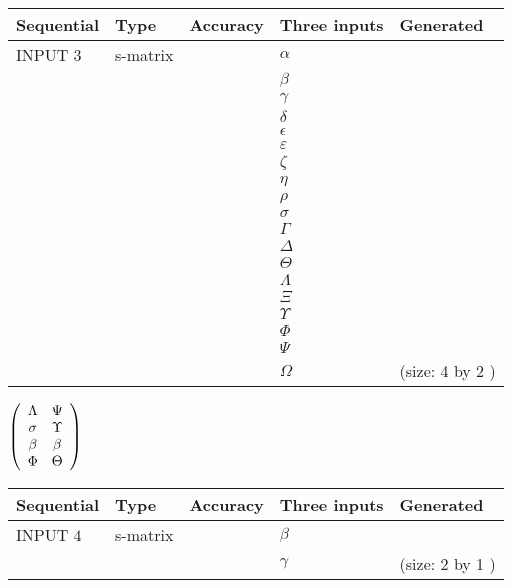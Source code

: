 \documentclass[12pt]{article}
\begin{document}
  
\noindent\begin{tabular}{|l|l|l|l|l|}
\hline
 Sequential & Type & Accuracy & Three inputs & Generated \\ 
\hline
 
 
  INPUT $            3 $ & s-matrix & & 
 $  \alpha $ & 
  \\
  & & & 
 $  \beta $ & 
  \\
  & & & 
 $  \gamma $ & 
  \\
  & & & 
 $  \delta $ & 
  \\
  & & & 
 $  \epsilon $ & 
  \\
  & & & 
 $  \varepsilon $ & 
  \\
  & & & 
 $                     \zeta $ & 
  \\
  & & & 
 $  \eta $ & 
  \\
  & & & 
 $  \rho $ & 
  \\
  & & & 
 $  \sigma $ & 
  \\
  & & & 
 $  \Gamma $ & 
  \\
  & & & 
 $  \Delta $ & 
  \\
  & & & 
 $  \Theta $ & 
  \\
  & & & 
 $  \Lambda $ & 
  \\
  & & & 
 $                     \Xi $ & 
  \\
  & & & 
 $  \Upsilon $ & 
  \\
  & & & 
 $  \Phi $ & 
  \\
  & & & 
 $  \Psi $ & 
  \\
  & & & 
 $  \Omega $ & 
  (size:            4  by            2 )
 \\  \hline  
 \end{tabular}
   
   
 $  \left( \begin{array}
 {
 c
 c
 }
 \Lambda & 
 \Psi \\ 
 \sigma & 
 \Upsilon \\ 
 \beta & 
 \beta \\ 
 \Phi & 
 \Theta
 \end{array} \right) $ 
  
  
\noindent\begin{tabular}{|l|l|l|l|l|}
\hline
 Sequential & Type & Accuracy & Three inputs & Generated \\ 
\hline
 
 
  INPUT $            4 $ & s-matrix & & 
 $  \beta $ & 
  \\
  & & & 
 $  \gamma $ & 
  (size:            2  by            1 )
 \\  \hline  
 \end{tabular}
   
\end{document}
